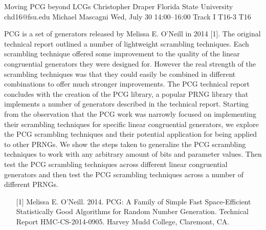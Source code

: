 \begin{talk}
  {Moving PCG beyond LCGs}%
  {Christopher Draper}%
  {Florida State University}%
  {chd16@fsu.edu}%
  {Michael Mascagni}%
  {}%
  {Wed, July 30 14:00–16:00 Track I}%
  {T16-3}%
  {T16}%
			
PCG is a set of generators released by Melissa E. O’Neill in 2014 [1]. The original technical report outlined a number of lightweight
scrambling techniques. Each scrambling technique offered some improvement to the quality of the linear congruential generators
they were designed for. However the real strength of the scrambling techniques was that they could easily be combined in different
combinations to offer much stronger improvements. The PCG technical report concludes with the creation of the PCG library, a
popular PRNG library that implements a number of generators described in the technical report. Starting from the observation that the
PCG work was narrowly focused on implementing their scrambling techniques for specific linear congruential generators, we explore
the PCG scrambling techniques and their potential application for being applied to other PRNGs. We show the steps taken to generalize the PCG
scrambling techniques to work with any arbitrary amount of bits and parameter values. Then test the PCG scrambling techniques
across different linear congruential generators and then test the PCG scrambling techniques across a number of different PRNGs.
\medskip

\begin{enumerate}
	\item[{[1]}] Melissa E. O’Neill. 2014. PCG: A Family of Simple Fast Space-Efficient Statistically Good Algorithms for Random Number Generation. Technical Report HMC-CS-2014-0905. Harvey Mudd College, Claremont, CA.
\end{enumerate}

\end{talk}
